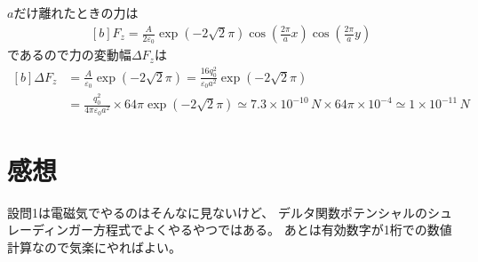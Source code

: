 \documentclass[../../master.tex]{subfiles}
\begin{document}
\subsection{}
\(a\)だけ離れたときの力は
\begin{equation}\begin{aligned}[b]
    F_z = \frac{A}{2\varepsilon_0}\exp(-2\sqrt{2}\pi)\cos(\frac{2\pi}{a}x)\cos(\frac{2\pi}{a}y)
\end{aligned}\end{equation}
であるので力の変動幅\(\Delta F_z\)は
\begin{equation}\begin{aligned}[b]
    \Delta F_z
    &= \frac{A}{\varepsilon_0}\exp(-2\sqrt{2}\pi)
    = \frac{16 q_0^2}{\varepsilon_0 a^2}\exp(-2\sqrt{2}\pi)\\
    &= \frac{q_0^2}{4\pi\varepsilon_0 a^2}\times 64\pi\exp(-2\sqrt{2}\pi)
    \simeq 7.3\times 10^{-10}\,\si{N} \times 64\pi\times 10^{-4}
    \simeq 1\times 10^{-11}\,\si{N}
\end{aligned}\end{equation}

\section*{感想}
設問1は電磁気でやるのはそんなに見ないけど、
デルタ関数ポテンシャルのシュレーディンガー方程式でよくやるやつではある。
あとは有効数字が1桁での数値計算なので気楽にやればよい。
\end{document}
